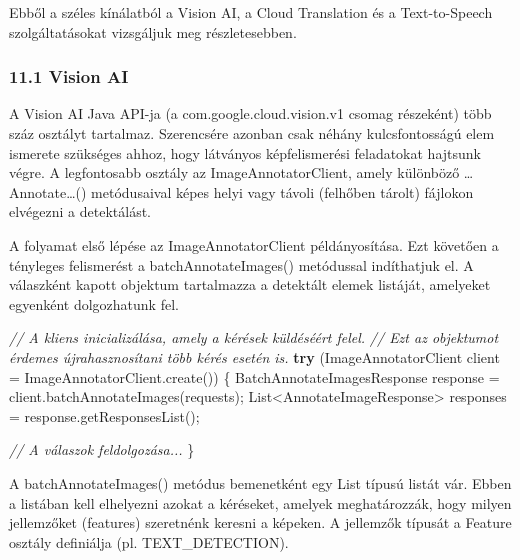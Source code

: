 \documentclass[
]{article}
\newenvironment{Shaded}{}{}
\newcommand{\BuiltInTok}[1]{\textcolor[rgb]{0.00,0.50,0.00}{#1}}
\newcommand{\CommentTok}[1]{\textcolor[rgb]{0.38,0.63,0.69}{\textit{#1}}}
\newcommand{\ControlFlowTok}[1]{\textcolor[rgb]{0.00,0.44,0.13}{\textbf{#1}}}
\newcommand{\FunctionTok}[1]{\textcolor[rgb]{0.02,0.16,0.49}{#1}}
\newcommand{\NormalTok}[1]{#1}
\newcommand{\OperatorTok}[1]{\textcolor[rgb]{0.40,0.40,0.40}{#1}}
\begin{document}
Ebből a széles kínálatból a Vision AI, a Cloud Translation és a
Text-to-Speech szolgáltatásokat vizsgáljuk meg részletesebben.

\hypertarget{vision-ai}{%
\subsubsection{11.1 Vision AI}\label{vision-ai}}

A Vision AI Java API-ja (a com.google.cloud.vision.v1 csomag részeként)
több száz osztályt tartalmaz. Szerencsére azonban csak néhány
kulcsfontosságú elem ismerete szükséges ahhoz, hogy látványos
képfelismerési feladatokat hajtsunk végre. A legfontosabb osztály az
ImageAnnotatorClient, amely különböző \ldots Annotate\ldots()
metódusaival képes helyi vagy távoli (felhőben tárolt) fájlokon
elvégezni a detektálást.

A folyamat első lépése az ImageAnnotatorClient példányosítása. Ezt
követően a tényleges felismerést a batchAnnotateImages() metódussal
indíthatjuk el. A válaszként kapott objektum tartalmazza a detektált
elemek listáját, amelyeket egyenként dolgozhatunk fel.

\begin{Shaded}
\begin{Highlighting}[]
\CommentTok{// A kliens inicializálása, amely a kérések küldéséért felel.}
\CommentTok{// Ezt az objektumot érdemes újrahasznosítani több kérés esetén is.}
\ControlFlowTok{try} \OperatorTok{(}\NormalTok{ImageAnnotatorClient client }\OperatorTok{=}\NormalTok{ ImageAnnotatorClient}\OperatorTok{.}\FunctionTok{create}\OperatorTok{())} \OperatorTok{\{}
\NormalTok{   BatchAnnotateImagesResponse response }\OperatorTok{=}\NormalTok{ client}\OperatorTok{.}\FunctionTok{batchAnnotateImages}\OperatorTok{(}\NormalTok{requests}\OperatorTok{);}
   \BuiltInTok{List}\OperatorTok{\textless{}}\NormalTok{AnnotateImageResponse}\OperatorTok{\textgreater{}}\NormalTok{ responses }\OperatorTok{=}\NormalTok{ response}\OperatorTok{.}\FunctionTok{getResponsesList}\OperatorTok{();}
   
   \CommentTok{// A válaszok feldolgozása...}
\OperatorTok{\}}
\end{Highlighting}
\end{Shaded}

A batchAnnotateImages() metódus bemenetként egy List típusú listát vár.
Ebben a listában kell elhelyezni azokat a kéréseket, amelyek
meghatározzák, hogy milyen jellemzőket (features) szeretnénk keresni a
képeken. A jellemzők típusát a Feature osztály definiálja (pl.
TEXT\_DETECTION).
\end{document}
